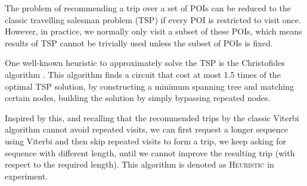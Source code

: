 

The problem of recommending a trip over a set of POIs can be reduced to the classic travelling salesman problem (TSP)
if every POI is restricted to visit once.
However, in practice, we normally only visit a subset of these POIs,
which means results of TSP cannot be trivially used unless the subset of POIs is fixed.


One well-known heuristic to approximately solve the TSP is the Christofides algorithm \citep{Christofides:1976}.
This algorithm finds a circuit that cost at most 1.5 times
of the optimal TSP solution, by constructing a minimum spanning tree and matching certain nodes, 
building the solution by simply bypassing repeated nodes.

Inspired by this, and recalling that the recommended trips by the classic Viterbi algorithm cannot avoid repeated visits,
we can first request a longer sequence using Viterbi and then skip repeated visits to form a trip, 
we keep asking for sequence with different length, until we cannot improve the resulting trip (with respect to the required length).
This algorithm is denoted as \textsc{Heuristic} in experiment.
